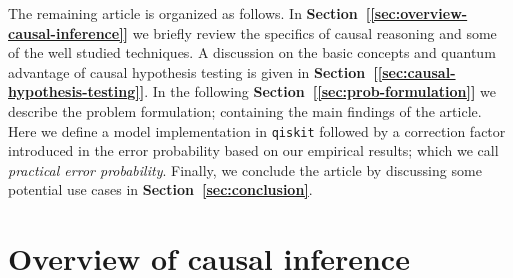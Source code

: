 \documentclass[%
 aps,
 jmp,%
 amsmath,amssymb,
 reprint,%
]{revtex4-2}
\begin{document}
The remaining article is organized as follows. 
In \textbf{Section~[\ref{sec:overview-causal-inference}]} we briefly review the specifics of causal reasoning and some of the well studied techniques. A discussion on the basic concepts and quantum advantage of causal hypothesis testing is given in
\textbf{Section~[\ref{sec:causal-hypothesis-testing}]}. In the following \textbf{Section~[\ref{sec:prob-formulation}]} we describe the problem formulation; containing the main findings of the article. Here we define a model implementation in \texttt{qiskit} followed by a correction factor introduced in the error probability based on our empirical results; which we call \textit{practical error probability}. Finally, we conclude the article by discussing some potential use cases in \textbf{Section~\ref{sec:conclusion}}.
\section{\label{sec:overview-causal-inference}Overview of causal inference}






\end{document}
